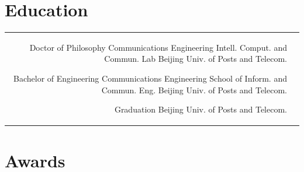 \documentclass[10pt]{article} %
\begin{document}
\begin{paracol}{2}
\section{Education} 
\begin{supertabular}{rl} %
	
	
	{Doctor of Philosophy} %
	{Communications Engineering} %
	{Intell. Comput. and Commun. Lab} %
	{Beijing Univ. of Posts and Telecom.} %
	
	
	{Bachelor of Engineering} %
	{Communications Engineering} %
	{School of Inform. and Commun. Eng.} %
	{Beijing Univ. of Posts and Telecom.} %
	
	{Graduation}%
	{} %
	{} %
	{Beijing Univ. of Posts and Telecom.} %
\end{supertabular}

%
%	
%	
%	
%	

\section{Awards}


\end{paracol}
\end{document}
